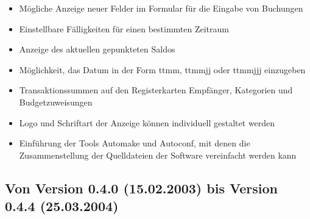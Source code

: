 \begin{itemize}
	\item Mögliche Anzeige neuer Felder im Formular für die Eingabe von Buchungen%
	\item Einstellbare Fälligkeiten für einen bestimmten Zeitraum%
	\item Anzeige des aktuellen gepunkteten Saldos%
	\item Möglichkeit, das Datum in der Form ttmm, ttmmjj oder ttmmjjj einzugeben%
	\item Transaktionssummen auf den Registerkarten Empfänger, Kategorien und Budgetzuweisungen%
	\item Logo und Schriftart der Anzeige können individuell gestaltet werden%
	\item Einführung der Tools Automake und Autoconf, mit denen die Zusammenstellung der Quelldateien der Software vereinfacht werden kann%
\end{itemize}


\subsection{Von Version 0.4.0 \textnormal{(15.02.2003)} bis Version 0.4.4 \textnormal{(25.03.2004)}}%

